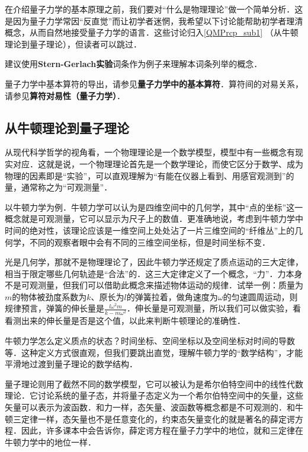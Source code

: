

在介绍量子力学的基本原理之前，我们要对“什么是物理理论”做一个简单分析．这是因为量子力学常因“反直觉”而让初学者迷惘，我希望以下讨论能帮助初学者理清概念，从而自然地接受量子力学的语言．这些讨论归入\autoref{QMPrcp_sub1} （从牛顿理论到量子理论），但读者可以跳过．

建议使用\textbf{Stern-Gerlach实验}词条作为例子来理解本词条列举的概念．

量子力学中基本算符的导出，请参见\textbf{量子力学中的基本算符}．算符间的对易关系，请参见\textbf{算符对易性（量子力学）}．

\subsection{从牛顿理论到量子理论}\label{QMPrcp_sub1}

从现代科学哲学的视角看，一个物理理论是一个数学模型，模型中有一些概念有现实对应．这就是说，一个物理理论首先是一个数学理论，而使它区分于数学、成为物理的因素即是“实验”，可以直观理解为“有能在仪器上看到、用感官观测到”的量，通常称之为“可观测量”．

以牛顿力学为例．牛顿力学可以认为是四维空间中的几何学，其中“点的坐标”这一概念就是可观测量，它可以显示为尺子上的数值．更准确地说，考虑到牛顿力学中时间的绝对性，该理论应该是一维空间上处处沾了一片三维空间的“纤维丛”上的几何学，不同的观察者眼中会有不同的三维空间坐标，但是时间坐标不变．

光是几何学，那就不是物理理论了，因此牛顿力学还规定了质点运动的三大定律，相当于限定哪些几何轨迹是“合法”的．这三大定律定义了一个概念，“力”．力本身不是可观测量，但我们可以借助此概念来描述物体运动的规律．试举一例：质量为$m$的物体被劲度系数为$k$、原长为$l$的弹簧拉着，做角速度为$\omega$的匀速圆周运动，则规律预言，弹簧的伸长量是$\frac{l\omega^2m}{k-m\omega^2}$．伸长量是可观测量，所以我们可以做实验，看看测出来的伸长量是否是这个值，以此来判断牛顿理论的准确性．

牛顿力学怎么定义质点的状态？时间坐标、空间坐标以及空间坐标对时间的导数等．这种定义方式很直观，但我们要跳出直觉，理解牛顿力学的“数学结构”，才能平滑地过渡到量子理论的数学结构．

量子理论则用了截然不同的数学模型，它可以被认为是希尔伯特空间中的线性代数理论．它讨论系统的量子态，并将量子态定义为一个希尔伯特空间中的矢量，这些矢量可以表示为波函数．和力一样，态矢量、波函数等概念都是不可观测的．和牛顿三定律一样，态矢量也不是任意变化的，约束态矢量变化的就是著名的薛定谔方程．因此，许多课本中会告诉你，薛定谔方程在量子力学中的地位，就和三定律在牛顿力学中的地位一样．


